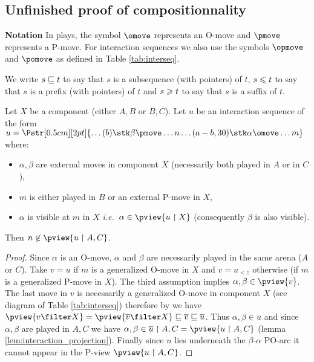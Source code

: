 \subsection{Unfinished proof of compositionnality} 
{\bf Notation} In plays, the symbol $\omove$ represents
an O-move and $\pmove$ represents
a P-move. For interaction sequences we also use
the symbols $\opmove$ and $\pomove$ as defined in Table \ref{tab:interseq}.

We write $s \sqsubseteq t$ to say that $s$ is a subsequence (with pointers) of $t$, $s \leqslant t$ to say that $s$ is a prefix (with pointers)
of $t$ and  $s \geqslant t$ to say that $s$ is a suffix of $t$.



\begin{lemma}
\label{lem:interjump}
Let $X$ be a component (either  $A,B$ or  $B,C$).
Let $u$ be an interaction sequence of the form
$ u =  
\Pstr[0.5cm][2pt]{ \ldots (b){\stk \beta \pmove}  \ldots
 {n}  \ldots  (a-b,30){\stk \alpha\omove}
\ldots m}$ where:
\begin{itemize}[-]
\item $\alpha,\beta$ are external moves in component $X$ (necessarily both played in $A$ or in $C$),
\item  $m$ is either played in $B$ or an external P-move in $X$,
\item  $\alpha$ is visible at $m$ in $X$ \emph{i.e.}~$\alpha\in \pview{u \upharpoonright X}$ (consequently $\beta$ is also visible).
\end{itemize}
Then $n \not\in \pview{u \upharpoonright A, C}$.
\end{lemma}
\begin{proof}
Since $\alpha$ is an O-move, $\alpha$ and $\beta$ are necessarily played in the same arena ($A$ or $C$).
Take $v=u$ if $m$ is a generalized O-move in $X$
and $v=u_{<z}$ otherwise (if $m$ is a generalized P-move in $X$).
The third assumption implies 
$\alpha,\beta\in \pview{v}$.
The last move in $v$ is necessarily a generalized O-move in component $X$ (see diagram of Table \ref{tab:interseq}) 
therefore by \cite[Lemma 3.3.1]{Harmer2005}
we have $\pview{v \filter X} = \pview{\overline{v} \filter X} \subseqof \overline{v} \subseqof \overline{u}$.
Thus $\alpha,\beta \in \overline{u}$ and
since $\alpha,\beta$ are played in $A,C$ we have 
$\alpha,\beta  \in \overline{u} \upharpoonright A,C 
= \pview{u \upharpoonright A,C}$ (lemma \ref{lem:interaction_projection}).
Finally since $n$ lies underneath the $\beta$-$\alpha$ PO-arc 
it cannot appear in the P-view  $\pview{u \upharpoonright A,C}$.
\end{proof}

